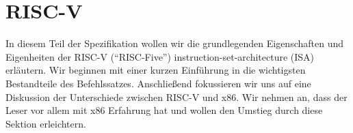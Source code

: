 \chapter{RISC-V}

In diesem Teil der Spezifikation wollen wir die grundlegenden Eigenschaften und
Eigenheiten der RISC-V (``RISC-Five'') instruction-set-architecture (ISA)
erläutern. Wir beginnen mit einer kurzen Einführung in die wichtigsten
Bestandteile des Befehlssatzes. Anschließend fokussieren wir uns auf eine
Diskussion der Unterschiede zwischen RISC-V und x86. Wir nehmen an, dass der
Leser vor allem mit x86 Erfahrung hat und wollen den Umstieg durch diese Sektion
erleichtern.



